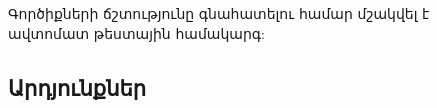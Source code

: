 {
	Գործիքների ճշտությունը գնահատելու համար մշակվել է ավտոմատ թեստային համակարգ:

	\subsection{Արդյունքներ}
}
